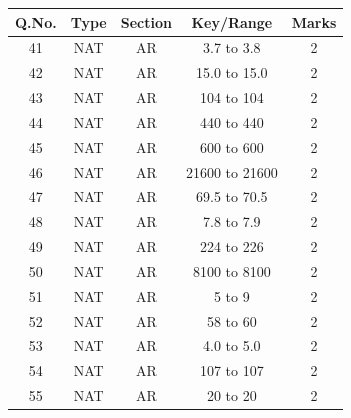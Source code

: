 \documentclass[journal,12pt,onecolumn]{IEEEtran}
\theoremstyle{remark}
\begin{document}
\renewcommand{\arraystretch}{2.2} %
\setlength{\tabcolsep}{20pt} %
\hspace{1.5cm}
\begin{tabular}{|c|c|c|c|c|}
\hline
\rowcolor{orange!30}
Q.No. & Type & Section & Key/Range & Marks \\
\hline
41 & NAT & AR & 3.7 to 3.8 & 2 \\
\hline
42 & NAT & AR & 15.0 to 15.0 & 2 \\
\hline
43 & NAT & AR & 104 to 104 & 2 \\
\hline
44 & NAT & AR & 440 to 440 & 2 \\
\hline
45 & NAT & AR & 600 to 600 & 2 \\
\hline
46 & NAT & AR & 21600 to 21600 & 2 \\
\hline
47 & NAT & AR & 69.5 to 70.5 & 2 \\
\hline
48 & NAT & AR & 7.8 to 7.9 & 2 \\
\hline
49 & NAT & AR & 224 to 226 & 2 \\
\hline
50 & NAT & AR & 8100 to 8100 & 2 \\
\hline
51 & NAT & AR & 5 to 9 & 2 \\
\hline
52 & NAT & AR & 58 to 60 & 2 \\
\hline
53 & NAT & AR & 4.0 to 5.0 & 2 \\
\hline
54 & NAT & AR & 107 to 107 & 2 \\
\hline
55 & NAT & AR & 20 to 20 & 2 \\
\hline
\end{tabular}

 
\end{document}
